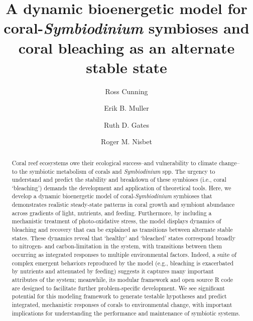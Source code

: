\documentclass[]{elsarticle} %
\begin{document}
\begin{frontmatter}

  \title{A dynamic bioenergetic model for coral-\emph{Symbiodinium} symbioses and
coral bleaching as an alternate stable state}
    \author[University of Hawaii]{Ross Cunning}
    \author[UCSB, MSI]{Erik B. Muller}
  
  
    \author[HIMB]{Ruth D. Gates}
  
  
    \author[UCSB]{Roger M. Nisbet}
  
  
      \address[HIMB]{Hawaii Institute of Marine Biology, School of Ocean and Earth Science
and Technology, University of Hawaii at Manoa, USA}
    \address[UCSB]{Department of Ecology, Evolution, and Marine Biology, University of
California, Santa Barbara, USA}
    \address[MSI]{Marine Science Institute, University of California, Santa Barbara, USA}
  
  \begin{abstract}
  Coral reef ecosystems owe their ecological success--and vulnerability to
  climate change--to the symbiotic metabolism of corals and
  \emph{Symbiodinium} spp. The urgency to understand and predict the
  stability and breakdown of these symbioses (i.e., coral `bleaching')
  demands the development and application of theoretical tools. Here, we
  develop a dynamic bioenergetic model of coral-\emph{Symbiodinium}
  symbioses that demonstrates realistic steady-state patterns in coral
  growth and symbiont abundance across gradients of light, nutrients, and
  feeding. Furthermore, by including a mechanistic treatment of
  photo-oxidative stress, the model displays dynamics of bleaching and
  recovery that can be explained as transitions between alternate stable
  states. These dynamics reveal that `healthy' and `bleached' states
  correspond broadly to nitrogen- and carbon-limitation in the system,
  with transitions between them occurring as integrated responses to
  multiple environmental factors. Indeed, a suite of complex emergent
  behaviors reproduced by the model (e.g., bleaching is exacerbated by
  nutrients and attenuated by feeding) suggests it captures many important
  attributes of the system; meanwhile, its modular framework and open
  source R code are designed to facilitate further problem-specific
  development. We see significant potential for this modeling framework to
  generate testable hypotheses and predict integrated, mechanistic
  responses of corals to environmental change, with important implications
  for understanding the performance and maintenance of symbiotic systems.
  \end{abstract}
  
 \end{frontmatter}
\end{document}
